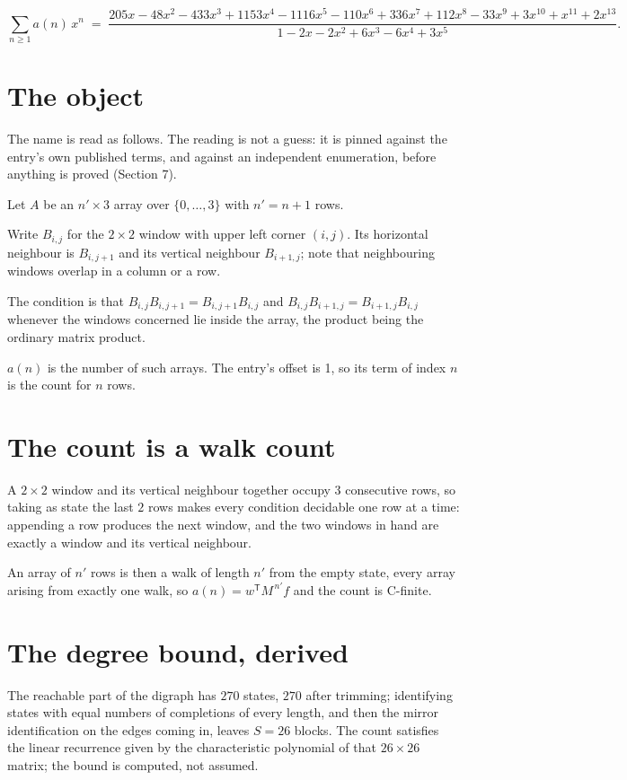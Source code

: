 \documentclass[11pt]{article}
\theoremstyle{definition}
\begin{document}
\[\sum_{n \ge 1} a(n)\,x^n \;=\; \frac{205x - 48x^{2} - 433x^{3} + 1153x^{4} - 1116x^{5} - 110x^{6} + 336x^{7} + 112x^{8} - 33x^{9} + 3x^{10} + x^{11} + 2x^{13}}{1 - 2x - 2x^{2} + 6x^{3} - 6x^{4} + 3x^{5}}.\]

\section{The object}

The name is read as follows. The reading is not a guess: it is pinned against the entry's own published terms, and against an independent enumeration, before anything is proved (Section 7).

Let $A$ be an $n' \times 3$ array over $\{0,\dots,3\}$ with $n' = n + 1$ rows.

Write $B_{i,j}$ for the $2\times2$ window with upper left corner $(i,j)$. Its horizontal neighbour is $B_{i,j+1}$ and its vertical neighbour $B_{i+1,j}$; note that neighbouring windows overlap in a column or a row.

The condition is that $B_{i,j}B_{i,j+1} = B_{i,j+1}B_{i,j}$ and $B_{i,j}B_{i+1,j} = B_{i+1,j}B_{i,j}$ whenever the windows concerned lie inside the array, the product being the ordinary matrix product.

$a(n)$ is the number of such arrays. The entry's offset is 1, so its term of index $n$ is the count for $n$ rows.

\section{The count is a walk count}

A $2\times2$ window and its vertical neighbour together occupy $3$ consecutive rows, so taking as state the last $2$ rows makes every condition decidable one row at a time: appending a row produces the next window, and the two windows in hand are exactly a window and its vertical neighbour.

An array of $n'$ rows is then a walk of length $n'$ from the empty state, every array arising from exactly one walk, so $a(n) = w^{\mathsf T}M^{\,n'}f$ and the count is C-finite.

\section{The degree bound, derived}

The reachable part of the digraph has $270$ states, $270$ after trimming; identifying states with equal numbers of completions of every length, and then the mirror identification on the edges coming in, leaves $S = 26$ blocks. The count satisfies the linear recurrence given by the characteristic polynomial of that $26\times26$ matrix; the bound is computed, not assumed.
\end{document}
